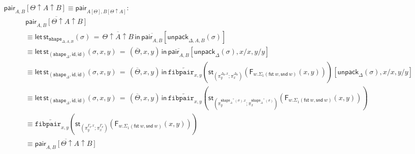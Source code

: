\documentclass[10pt]{article}
\theoremstyle{definition}
\newcommand\dsd[1]{\ensuremath{\mathsf{#1}}}
\newcommand{\app}[2]{\ensuremath{#1 \: #2}}
\newcommand{\fst}[1]{\app{\dsd{fst}}{#1}}
\newcommand{\snd}[1]{\app{\dsd{snd}}{#1}}
\newcommand{\id}{\mathsf{id}}
\newcommand{\rewrite}[2]{\overleftarrow{#1}(#2)}
\newcommand\StI[2]{\ensuremath{\mathsf{st}_{#1}(#2)}}
\newcommand\StE[4]{\ensuremath{\mathsf{let} \, \StI{#1}{#3} \, = \, {#2} \, \mathsf{in} \, #4}}
\newcommand\FIs[2]{\ensuremath{\mathsf{F}_{#1}{(#2)}}}
\newcommand\TrPlus[2]{\ensuremath{{#1}^+(#2)}}
\newcommand\unpack[2]{\ensuremath{\mathsf{unpack}_{#1}(#2)}}
\newcommand{\modeof}[1]{{#1}_p}
\newcommand{\tshape}[1]{\ensuremath{\mathtt{shape}_{#1}}}
\newcommand{\upstairs}[1]{\overline{#1}}
\newcommand\fibpair[1]{\ensuremath{\mathtt{fibpair}_{#1}}}
\newcommand\qpair[1]{\ensuremath{\mathsf{pair}_{#1}}}
\begin{document}
\begin{enumerate}[style = multiline, labelwidth = 80pt]
\item[{$\qpair{A, B}[\Theta \uparrow A \uparrow B] \equiv \qpair{A[\Theta], B[\Theta \uparrow A]}$}:]
\begin{align*}
&\upstairs{\qpair{A, B}[\Theta \uparrow A \uparrow B]} \\
&\equiv \StE{\tshape{\Delta, A, B}}{\upstairs{\Theta \uparrow A \uparrow B}}{\sigma}{\upstairs{\qpair{A, B}}[\unpack{\Delta, A, B}{\sigma}]} \\
&\equiv \StE{(\tshape{\Delta}, \id, \id)}{(\upstairs{\Theta},x,y)}{\sigma,x,y}{\upstairs{\qpair{A, B}}[\unpack{\Delta}{\sigma}, x/x, y/y]} \\
&\equiv \StE{(\tshape{\Delta}, \id, \id)}{(\upstairs{\Theta},x,y)}{\sigma,x,y}{\rewrite{\fibpair{x,y}}{\StI{(\pi^{\modeof{\Delta}.x}_y;\pi^{\modeof{\Delta}}_x)}{\FIs{w. \Sigma_1(\fst w, \snd w)}{x,y}}}[\unpack{\Delta}{\sigma}, x/x, y/y]} \\
&\equiv \StE{(\tshape{\Delta}, \id, \id)}{(\upstairs{\Theta},x,y)}{\sigma,x,y}{\rewrite{\fibpair{x,y}}{\StI{(\pi^{\TrPlus{\tshape{\Delta}}{\sigma}.x}_y;\pi^{\TrPlus{\tshape{\Delta}}{\sigma}}_x)}{\FIs{w. \Sigma_1(\fst w, \snd w)}{x,y}}}} \\
&\equiv \rewrite{\fibpair{x,y}}{\StI{(\pi^{\modeof{\Gamma}.x}_y;\pi^{\modeof{\Gamma}}_x)}{\FIs{w. \Sigma_1(\fst w, \snd w)}{x,y}}} \\
&\equiv \upstairs{\qpair{A, B}[\Theta \uparrow A \uparrow B]}
\end{align*}


\end{enumerate}
\end{document}
